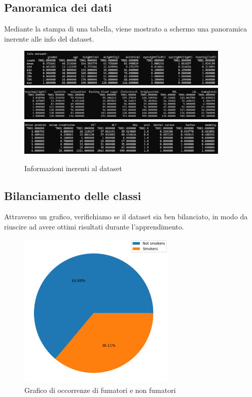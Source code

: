 \documentclass{article}
\begin{document}
\subsection{Panoramica dei dati}
Mediante la stampa di una tabella, viene mostrato a schermo una panoramica inerente alle info del dataset.\\
\begin{figure}[H]
        \includegraphics[width=0.9\textwidth]{info1}
        \includegraphics[width=0.9\textwidth]{info2}
        \includegraphics[width=0.9\textwidth]{info3}
        \centering
        \caption{Informazioni inerenti al dataset}
        \centering
\end{figure}

\subsection{Bilanciamento delle classi}
Attraverso un grafico, verifichiamo se il dataset sia ben bilanciato, in modo da riuscire ad avere ottimi risultati durante l'apprendimento.

\begin{figure}[H]
        \includegraphics[width=7.5cm]{grafico1}
        \centering
        \caption{Grafico di occorrenze di fumatori e non fumatori}
        \centering
\end{figure}
\end{document}
